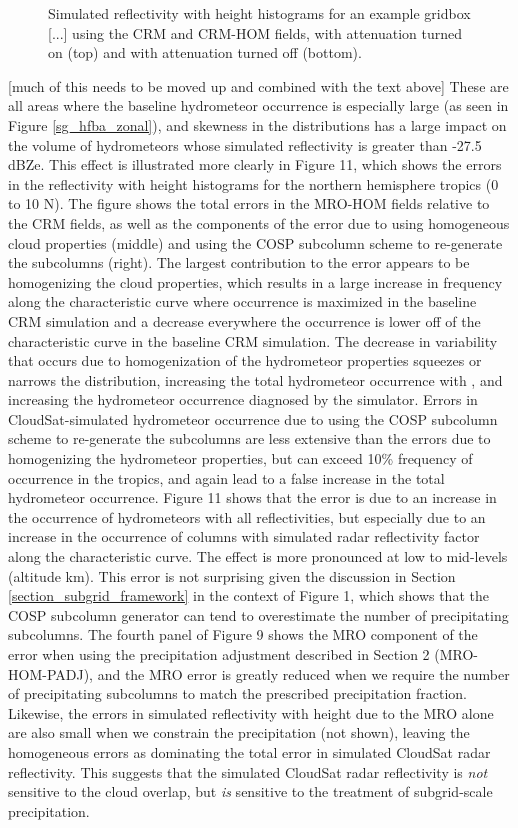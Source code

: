 \begin{figure}
\caption{Simulated reflectivity with height histograms for an example gridbox [...] using the CRM and CRM-HOM fields, with attenuation turned on (top) and with attenuation turned off (bottom).}
\label{sg_cfadDbze94_testatt}
\end{figure}

[much of this needs to be moved up and combined with the text above] These are all areas where the baseline hydrometeor occurrence is especially large (as seen in Figure \ref{sg_hfba_zonal}), and skewness in the distributions has a large impact on the volume of hydrometeors whose simulated reflectivity is greater than -27.5 dBZe. This effect is illustrated more clearly in Figure 11, which shows the errors in the reflectivity with height histograms for the northern hemisphere tropics (0 to 10 N). The figure shows the total errors in the MRO-HOM fields relative to the CRM fields, as well as the components of the error due to using homogeneous cloud properties (middle) and using the COSP subcolumn scheme to re-generate the subcolumns (right). The largest contribution to the error appears to be homogenizing the cloud properties, which results in a large increase in frequency along the characteristic curve where occurrence is maximized in the baseline CRM simulation and a decrease everywhere the occurrence is lower off of the characteristic curve in the baseline CRM simulation. The decrease in variability that occurs due to homogenization of the hydrometeor properties squeezes or narrows the distribution, increasing the total hydrometeor occurrence with , and increasing the hydrometeor occurrence diagnosed by the simulator.  Errors in CloudSat-simulated hydrometeor occurrence due to using the COSP subcolumn scheme to re-generate the subcolumns are less extensive than the errors due to homogenizing the hydrometeor properties, but can exceed 10\% frequency of occurrence in the tropics, and again lead to a false increase in the total hydrometeor occurrence. Figure 11 shows that the error is due to an increase in the occurrence of hydrometeors with all reflectivities, but especially due to an increase in the occurrence of columns with simulated radar reflectivity factor along the characteristic curve. The effect is more pronounced at low to mid-levels (altitude  km). This error is not surprising given the discussion in Section \ref{section_subgrid_framework} in the context of Figure 1, which shows that the COSP subcolumn generator can tend to overestimate the number of precipitating subcolumns. The fourth panel of Figure 9 shows the MRO component of the error when using the precipitation adjustment described in Section 2 (MRO-HOM-PADJ), and the MRO error is greatly reduced when we require the number of precipitating subcolumns to match the prescribed precipitation fraction. Likewise, the errors in simulated reflectivity with height due to the MRO alone are also small when we constrain the precipitation (not shown), leaving the homogeneous errors as dominating the total error in simulated CloudSat radar reflectivity. This suggests that the simulated CloudSat radar reflectivity is \emph{not} sensitive to the cloud overlap, but \emph{is} sensitive to the treatment of subgrid-scale precipitation.

